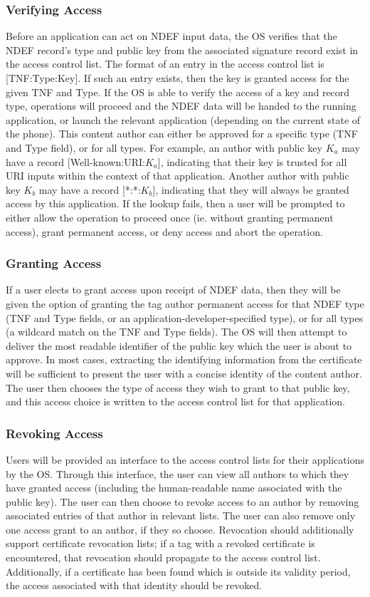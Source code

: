 \documentclass[12pt]{article}
\begin{document}
\subsubsection{Verifying Access}
Before an application can act on NDEF input data, the OS verifies that the NDEF record's type and public key from the associated signature record exist in the access control list.
The format of an entry in the access control list is [TNF:Type:Key].
If such an entry exists, then the key is granted access for the given TNF and Type.
If the OS is able to verify the access of a key and record type, operations will proceed and the NDEF data will be handed to the running application, or launch the relevant application (depending on the current state of the phone).
This content author can either be approved for a specific type (TNF and Type field), or for all types.
For example, an author with public key $K_a$ may have a record [Well-known:URI:$K_a$], indicating that their key is trusted for all URI inputs within the context of that application.
Another author with public key $K_b$ may have a record [*:*:$K_b$], indicating that they will always be granted access by this application.
If the lookup fails, then a user will be prompted to either allow the operation to proceed once (ie. without granting permanent access), grant permanent access, or deny access and abort the operation.
\subsubsection{Granting Access}
If a user elects to grant access upon receipt of NDEF data, then they will be given the option of granting the tag author permanent access for that NDEF type (TNF and Type fields, or an application-developer-specified type), or for all types (a wildcard match on the TNF and Type fields).
The OS will then attempt to deliver the most readable identifier of the public key which the user is about to approve.
In most cases, extracting the identifying information from the certificate will be sufficient to present the user with a concise identity of the content author.
The user then chooses the type of access they wish to grant to that public key, and this access choice is written to the access control list for that application.
\subsubsection{Revoking Access}
Users will be provided an interface to the access control lists for their applications by the OS.
Through this interface, the user can view all authors to which they have granted access (including the human-readable name associated with the public key).
The user can then choose to revoke access to an author by removing associated entries of that author in relevant lists.
The user can also remove only one access grant to an author, if they so choose.
Revocation should additionally support certificate revocation lists; if a tag with a revoked certificate is encountered, that revocation should propagate to the access control list.
Additionally, if a certificate has been found which is outside its validity period, the access associated with that identity should be revoked.
\end{document}
